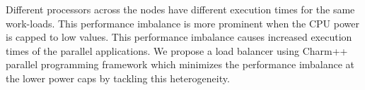 Different processors across the nodes have different execution times for the
same work-loads. This performance imbalance is more prominent  when the CPU power is
capped to low values. This performance imbalance causes increased execution
times of the parallel applications.  We propose a load balancer using Charm++
parallel programming framework which minimizes the performance imbalance at the
lower power caps by tackling this heterogeneity.
